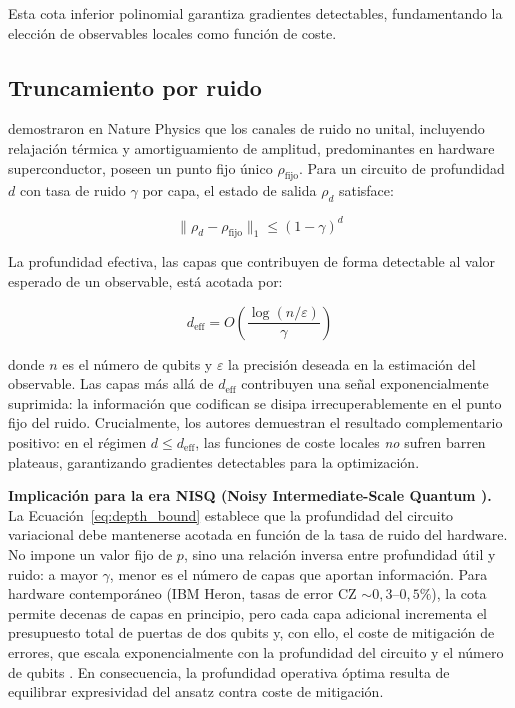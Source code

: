 \documentclass[11pt,a4paper,spanish]{book}
\begin{document}
\noindent Esta cota inferior polinomial garantiza gradientes detectables, fundamentando la elección de observables locales como función de coste.

\subsection{Truncamiento por ruido}

\citet{mele2026} demostraron en Nature Physics que los canales de ruido no unital, incluyendo relajación térmica y amortiguamiento de amplitud, predominantes en hardware superconductor, poseen un punto fijo único $\rho_{\text{fijo}}$. Para un circuito de profundidad $d$ con tasa de ruido $\gamma$ por capa, el estado de salida $\rho_d$ satisface:

\begin{equation}
\|\rho_d - \rho_{\text{fijo}}\|_1 \leq (1 - \gamma)^d
\label{eq:truncation}
\end{equation}

\noindent La profundidad efectiva, las capas que contribuyen de forma detectable al valor esperado de un observable, está acotada por:

\begin{equation}
d_{\text{eff}} = O\!\left(\frac{\log(n/\varepsilon)}{\gamma}\right)
\label{eq:depth_bound}
\end{equation}

\noindent donde $n$ es el número de qubits y $\varepsilon$ la precisión deseada en la estimación del observable. Las capas más allá de $d_{\text{eff}}$ contribuyen una señal exponencialmente suprimida: la información que codifican se disipa irrecuperablemente en el punto fijo del ruido. Crucialmente, los autores demuestran el resultado complementario positivo: en el régimen $d \leq d_{\text{eff}}$, las funciones de coste locales \emph{no} sufren barren plateaus, garantizando gradientes detectables para la optimización.

\textbf{Implicación para la era NISQ (Noisy Intermediate-Scale Quantum \citep{preskill2018}).} La Ecuación~\ref{eq:depth_bound} establece que la profundidad del circuito variacional debe mantenerse acotada en función de la tasa de ruido del hardware. No impone un valor fijo de $p$, sino una relación inversa entre profundidad útil y ruido: a mayor $\gamma$, menor es el número de capas que aportan información. Para hardware contemporáneo (IBM Heron, tasas de error CZ $\sim 0,3$--$0,5\%$), la cota permite decenas de capas en principio, pero cada capa adicional incrementa el presupuesto total de puertas de dos qubits y, con ello, el coste de mitigación de errores, que escala exponencialmente con la profundidad del circuito y el número de qubits \citep{tsubouchi2023}. En consecuencia, la profundidad operativa óptima resulta de equilibrar expresividad del ansatz contra coste de mitigación.
\end{document}
